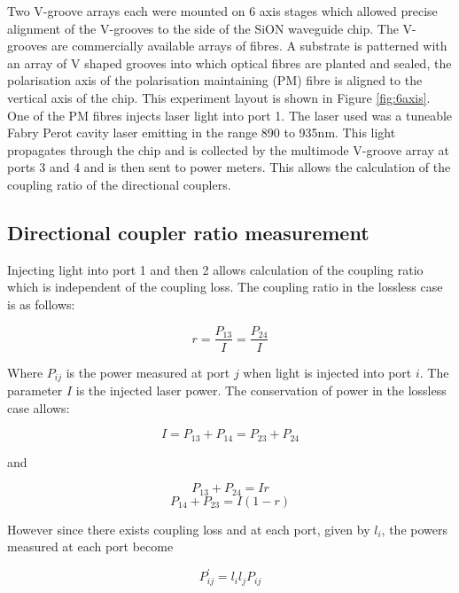 Two V-groove arrays each were mounted on 6 axis stages which allowed precise
alignment of the V-grooves to the side of the SiON waveguide chip. The V-grooves
are commercially available arrays of fibres. A substrate is patterned with an
array of V shaped grooves into which optical fibres are planted and sealed, the polarisation axis
of the polarisation maintaining (PM) fibre is aligned to the vertical axis of the chip. This
experiment layout is shown in Figure \ref{fig:6axis}. One of the PM fibres
injects laser light into port 1. The laser used was a tuneable Fabry Perot
cavity laser emitting in the range 890 to 935nm. This light propagates through
the chip and is collected by the multimode V-groove array at ports 3 and 4 and
is then sent to power meters. This allows the calculation of the coupling ratio
of the directional couplers.

\subsection{Directional coupler ratio measurement}

Injecting light into port 1 and then 2 allows calculation of the coupling
ratio which is independent of the coupling loss. The coupling ratio in the
lossless case is as follows:

\begin{equation} r  = \frac{P_{13}}{I} = \frac{P_{24}}{I} \end{equation}

Where $P_{ij}$ is the power measured at port $j$ when light is injected into
port $i$. The parameter $I$ is the injected laser power. The conservation of
power in the lossless case allows:

\begin{equation} I = P_{13}+P_{14} = P_{23}+P_{24} \end{equation}

and

\begin{equation}\label{eqn:p1} P_{13}+P_{24} = Ir \end{equation}\label{eqn:p2}
\begin{equation} P_{14}+P_{23} = I(1-r) \end{equation}

However since there exists coupling loss and at each port, given by $l_i$, the
powers measured at each port become

\begin{equation} P^{'}_{ij} = l_i l_j P_{ij} \end{equation}

